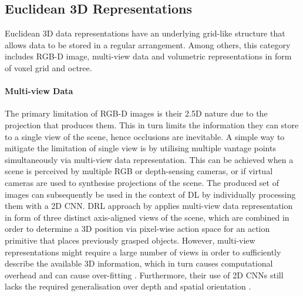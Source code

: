 \subsection{Euclidean 3D Representations}

Euclidean 3D data representations have an underlying grid-like structure that allows data to be stored in a regular arrangement. Among others, this category includes RGB-D image, multi-view data and volumetric representations in form of voxel grid and octree.


\paragraph{Multi-view Data} The primary limitation of RGB-D images is their 2.5D nature due to the projection that produces them. This in turn limits the information they can store to a single view of the scene, hence occlusions are inevitable. A simple way to mitigate the limitation of single view is by utilising multiple vantage points simultaneously via multi-view data representation. This can be achieved when a scene is perceived by multiple RGB or depth-sensing cameras, or if virtual cameras are used to synthesise projections of the scene. The produced set of images can subsequently be used in the context of DL by individually processing them with a 2D CNN. DRL approach by \citet{gualtieri_learning_2018} applies multi-view data representation in form of three distinct axis-aligned views of the scene, which are combined in order to determine a 3D position via pixel-wise action space for an action primitive that places previously grasped objects. However, multi-view representations might require a large number of views in order to sufficiently describe the available 3D information, which in turn causes computational overhead and can cause over-fitting \cite{ahmed_deep_2018}. Furthermore, their use of 2D CNNs still lacks the required generalisation over depth and spatial orientation \cite{gualtieri_pick_2018}.


